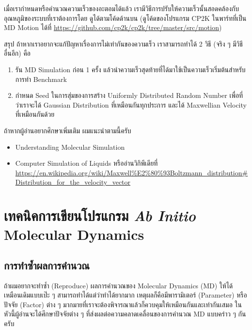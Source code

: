 \vspace{5pt}

\noindent เมื่อเรากำหนดหรือคำนวณความเร็วของอะตอมได้แล้ว เรามีวิธีการปรับให้ความเร็วนั้นสอดคล้องกับอุณหภูมิของระบบที่เราต้องการโดย%
ดูได้ตามโค้ดด้านบน (ดูโค้ดของโปรแกรม CP2K ในพาร์ทที่เป็น MD Motion ได้ที่
\url{https://github.com/cp2k/cp2k/tree/master/src/motion})

สรุป ถ้าหากเราอยากจะแก้ปัญหาเรื่องการไม่เท่ากันของความเร็ว เราสามารถทำได้ 2 วิธี (จริง ๆ มีวิธีอื่นอีก) คือ

\begin{enumerate}[topsep=0pt,noitemsep]
  \setlength\itemsep{0.5em}
  \item รัน MD Simulation ก่อน 1 ครั้ง แล้วนำความเร็วสุดท้ายที่ได้มาใช้เป็นความเร็วเริ่มต้นสำหรับการทำ Benchmark

  \item กำหนด Seed ในการสุ่มของการสร้าง Uniformly Distributed Random Number เพื่อที่ว่าเราจะได้ Gaussian Distribution
        ที่เหมือนกันทุกประการ และได้ Maxwellian Velocity ที่เหมือนกันด้วย
\end{enumerate}

ถ้าหากผู้อ่านอยากศึกษาเพิ่มเติม ผมแนะนำตามนี้ครับ

\begin{itemize}[topsep=0pt,noitemsep]
  \setlength\itemsep{0.5em}
  \item Understanding Molecular Simulation

  \item Computer Simulation of Liquids
        หรืออ่านวิกิพีเดียที่ \url{https://en.wikipedia.org/wiki/Maxwell%E2%80%93Boltzmann_distribution#Distribution_for_the_velocity_vector}
\end{itemize}

\section{เทคนิคการเขียนโปรแกรม \textit{Ab Initio} Molecular Dynamics}

\subsection{การทำซ้ำผลการคำนวณ}

ถ้าผมอยากจะทำซ้ำ (Reproduce) ผลการคำนวณของ Molecular Dynamics (MD) ให้ได้เหมือนเดิมแบบเป๊ะ ๆ สามารถทำได้แต่ว่าทำได้ยากมาก
เหตุผลก็คือมีพารามิเตอร์ (Parameter) หรือปัจจัย (Factor) ต่าง ๆ มากมายที่เราจะต้องพิจารณาแล้วก็ควบคุมให้เหมือนกันและเท่ากันเสมอ
ในหัวนี้ผู้อ่านจะได้ศึกษาปัจจัยต่าง ๆ ที่ส่งผลต่อความคลาดเคลื่อนของการคำนวณ MD แบบคร่าว ๆ กันครับ


